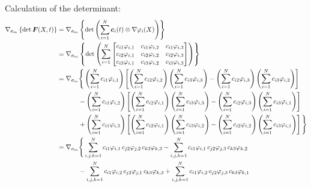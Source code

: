 Calculation of the determinant:
\begin{align}
  \nabla_{\Bc_m}\left\{\det \BF(X,t)\right\}
  &=\nabla_{\Bc_m}\left\{\det \left( \sumlim{i=1}{N}{\Bc_i(t) \otimes \nabla \varphi_i(X)} \right) \right\} \nonumber\\
  &=\nabla_{\Bc_m}\left\{\det \left( \sumlim{i=1}{N}{
      \begin{bmatrix}
        c_{i1} \varphi_{i,1}  & c_{i1} \varphi_{i,2}  & c_{i1} \varphi_{i,3} \\
        c_{i2} \varphi_{i,1}  & c_{i2} \varphi_{i,2}  & c_{i2} \varphi_{i,3} \\
        c_{i3} \varphi_{i,1}  & c_{i3} \varphi_{i,2}  & c_{i3} \varphi_{i,3}
      \end{bmatrix}
    } \right) \right\} \nonumber\\
  &=\nabla_{\Bc_m}\Bigg\{
      \left( \sumlim{i=1}{N}{c_{i1}\varphi_{i,1}}\right) \left[
        \left( \sumlim{i=1}{N}{c_{i2}\varphi_{i,2}}\right) \left( \sumlim{i=1}{N}{c_{i3}\varphi_{i,3}}\right)
        - \left( \sumlim{i=1}{N}{c_{i2}\varphi_{i,3}}\right) \left( \sumlim{i=1}{N}{c_{i3}\varphi_{i,2}}\right)
      \right]
      \nonumber\\
      &\hspace{11.5mm} -\left( \sumlim{i=1}{N}{c_{i1}\varphi_{i,2}}\right) \left[
        \left( \sumlim{i=1}{N}{c_{i2}\varphi_{i,1}}\right) \left( \sumlim{i=1}{N}{c_{i3}\varphi_{i,3}}\right)
        - \left( \sumlim{i=1}{N}{c_{i2}\varphi_{i,3}}\right) \left( \sumlim{i=1}{N}{c_{i3}\varphi_{i,1}}\right)
      \right]
      \nonumber\\
      &\hspace{11.5mm} +\left( \sumlim{i=1}{N}{c_{i1}\varphi_{i,3}}\right) \left[
        \left( \sumlim{i=1}{N}{c_{i2}\varphi_{i,1}}\right) \left( \sumlim{i=1}{N}{c_{i3}\varphi_{i,2}}\right)
        - \left( \sumlim{i=1}{N}{c_{i2}\varphi_{i,2}}\right) \left( \sumlim{i=1}{N}{c_{i3}\varphi_{i,1}}\right)
      \right]
    \Bigg\}\nonumber\\
  &=\nabla_{\Bc_m}\Bigg\{
  \sumlim{i,j,k=1}{N}{c_{i1} \varphi_{i,1} \, c_{j2} \varphi_{j,2} \, c_{k3}\varphi_{k,3}}
    -\sumlim{i,j,k=1}{N}{c_{i1} \varphi_{i,1} \, c_{j2} \varphi_{j,3} \, c_{k3}\varphi_{k,2}}
    \nonumber\\
    &\hspace{11.5mm}-\sumlim{i,j,k=1}{N}{c_{i1} \varphi_{i,2} \, c_{j2} \varphi_{j,1} \, c_{k3}\varphi_{k,3}}
    +\sumlim{i,j,k=1}{N}{c_{i1} \varphi_{i,2} \, c_{j2} \varphi_{j,3} \, c_{k3}\varphi_{k,1}}
    \nonumber\\

\end{align}
